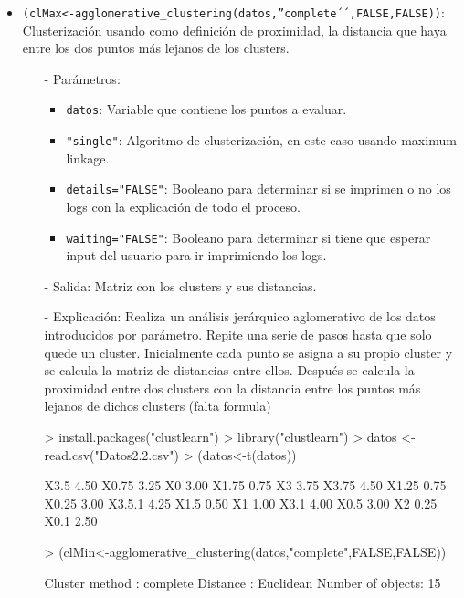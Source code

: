 \documentclass[a4paper, 12pt]{article}
\begin{document}
\begin{itemize}
		\item \texttt{(clMax<-agglomerative\_clustering(datos,''complete´´,FALSE,FALSE))}: Clusterización usando como definición de proximidad, la distancia que haya entre los dos puntos más lejanos de los clusters.
		\begin{itemize}
			\item [-] Parámetros:
			\begin{itemize}
				\item \texttt{datos}: Variable que contiene los puntos a evaluar.
				\item \texttt{"single"}: Algoritmo de clusterización, en este caso usando maximum linkage.
				\item \texttt{details="FALSE"}: Booleano para determinar si se imprimen o no los logs con la explicación de todo el proceso.
				\item \texttt{waiting="FALSE"}: Booleano para determinar si tiene que esperar input del usuario para ir imprimiendo los logs.
			\end{itemize}
			\item [-] Salida: Matriz con los clusters y sus distancias.
			\item [-] Explicación: Realiza un análisis jerárquico aglomerativo de los datos introducidos por parámetro. Repite una serie de pasos hasta que solo quede un cluster. Inicialmente cada punto se asigna a su propio cluster y se calcula la matriz de distancias entre ellos. Después se calcula la proximidad entre dos clusters con la distancia entre los puntos más lejanos de dichos clusters (falta formula)
\begin{Schunk}
\begin{Sinput}
> install.packages("clustlearn")
> library("clustlearn")
> datos <- read.csv("Datos2.2.csv")
> (datos<-t(datos))
\end{Sinput}
\begin{Soutput}
       [,1]
X3.5   4.50
X0.75  3.25
X0     3.00
X1.75  0.75
X3     3.75
X3.75  4.50
X1.25  0.75
X0.25  3.00
X3.5.1 4.25
X1.5   0.50
X1     1.00
X3.1   4.00
X0.5   3.00
X2     0.25
X0.1   2.50
\end{Soutput}
\begin{Sinput}
> (clMin<-agglomerative_clustering(datos,"complete",FALSE,FALSE))
\end{Sinput}
\begin{Soutput}
Cluster method   : complete 
Distance         : Euclidean 
Number of objects: 15 
\end{Soutput}
\end{Schunk}
		\end{itemize}
		

\end{itemize}
\end{document}
